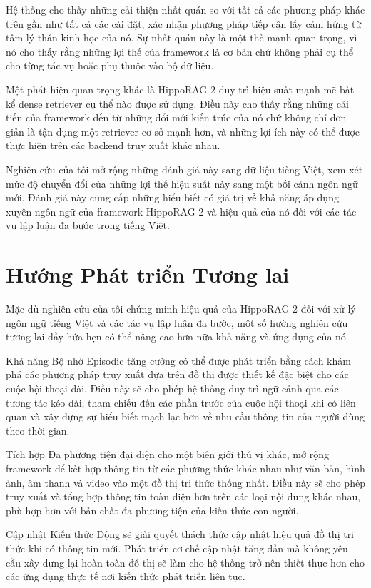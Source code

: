 \documentclass[../main.tex]{subfiles}
\begin{document}
Hệ thống cho thấy những cải thiện nhất quán so với tất cả các phương pháp khác trên gần như tất cả các cài đặt, xác nhận phương pháp tiếp cận lấy cảm hứng từ tâm lý thần kinh học của nó. Sự nhất quán này là một thế mạnh quan trọng, vì nó cho thấy rằng những lợi thế của framework là cơ bản chứ không phải cụ thể cho từng tác vụ hoặc phụ thuộc vào bộ dữ liệu.

Một phát hiện quan trọng khác là HippoRAG 2 duy trì hiệu suất mạnh mẽ bất kể dense retriever cụ thể nào được sử dụng. Điều này cho thấy rằng những cải tiến của framework đến từ những đổi mới kiến trúc của nó chứ không chỉ đơn giản là tận dụng một retriever cơ sở mạnh hơn, và những lợi ích này có thể được thực hiện trên các backend truy xuất khác nhau.

Nghiên cứu của tôi mở rộng những đánh giá này sang dữ liệu tiếng Việt, xem xét mức độ chuyển đổi của những lợi thế hiệu suất này sang một bối cảnh ngôn ngữ mới. Đánh giá này cung cấp những hiểu biết có giá trị về khả năng áp dụng xuyên ngôn ngữ của framework HippoRAG 2 và hiệu quả của nó đối với các tác vụ lập luận đa bước trong tiếng Việt.

\section{Hướng Phát triển Tương lai}
Mặc dù nghiên cứu của tôi chứng minh hiệu quả của HippoRAG 2 đối với xử lý ngôn ngữ tiếng Việt và các tác vụ lập luận đa bước, một số hướng nghiên cứu tương lai đầy hứa hẹn có thể nâng cao hơn nữa khả năng và ứng dụng của nó.

Khả năng Bộ nhớ Episodic tăng cường có thể được phát triển bằng cách khám phá các phương pháp truy xuất dựa trên đồ thị được thiết kế đặc biệt cho các cuộc hội thoại dài. Điều này sẽ cho phép hệ thống duy trì ngữ cảnh qua các tương tác kéo dài, tham chiếu đến các phần trước của cuộc hội thoại khi có liên quan và xây dựng sự hiểu biết mạch lạc hơn về nhu cầu thông tin của người dùng theo thời gian.

Tích hợp Đa phương tiện đại diện cho một biên giới thú vị khác, mở rộng framework để kết hợp thông tin từ các phương thức khác nhau như văn bản, hình ảnh, âm thanh và video vào một đồ thị tri thức thống nhất. Điều này sẽ cho phép truy xuất và tổng hợp thông tin toàn diện hơn trên các loại nội dung khác nhau, phù hợp hơn với bản chất đa phương tiện của kiến thức con người.

Cập nhật Kiến thức Động sẽ giải quyết thách thức cập nhật hiệu quả đồ thị tri thức khi có thông tin mới. Phát triển cơ chế cập nhật tăng dần mà không yêu cầu xây dựng lại hoàn toàn đồ thị sẽ làm cho hệ thống trở nên thiết thực hơn cho các ứng dụng thực tế nơi kiến thức phát triển liên tục.
\end{document}

